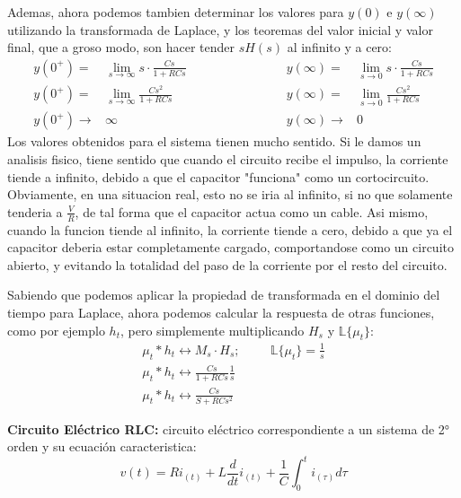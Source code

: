 \documentclass[12pt,a4paper]{report}
\begin{document}
\begin{enumerate}[label=\alph*)]
      Ademas, ahora podemos tambien determinar los valores para $y(0)$ e $y(\infty)$ utilizando la transformada de
      Laplace, y los teoremas del valor inicial y valor final, que a groso modo, son hacer tender $sH(s)$ al
      infinito y a cero:
      \begin{align*}
        y(0^+) =& \lim_{s\to\infty} s \cdot \frac{Cs}{1+RCs} \hspace{3cm} &y(\infty) =& \lim_{s\to0} s \cdot
          \frac{Cs}{1+RCs}\\[6pt]
        y(0^+) =& \lim_{s\to\infty} \frac{Cs^2}{1+RCs} \hspace{3cm} &y(\infty) =& \lim_{s\to0} \frac{Cs^2}{1+RCs}\\[6pt]
        y(0^+) \to& \infty \hspace{3cm} &y(\infty) \to& 0
      \end{align*}
      Los valores obtenidos para el sistema tienen mucho sentido. Si le damos un analisis fisico, tiene sentido que
      cuando el circuito recibe el impulso, la corriente tiende a infinito, debido a que el capacitor "funciona" como
      un cortocircuito. Obviamente, en una situacion real, esto no se iria al infinito, si no que solamente tenderia a
      $\frac{V}{R}$, de tal forma que el capacitor actua como un cable.
      Asi mismo, cuando la funcion tiende al infinito, la corriente tiende a cero, debido a que ya el capacitor deberia
      estar completamente cargado, comportandose como un circuito abierto, y evitando la totalidad del paso de la
      corriente por el resto del circuito.

      Sabiendo que podemos aplicar la propiedad de transformada en el dominio del tiempo para Laplace, ahora podemos
      calcular la respuesta de otras funciones, como por ejemplo $h_t$, pero simplemente multiplicando $H_s$ y
      $\mathbb{L}\{\mu_t\}$:
      \begin{gather*}
        \mu_t * h_t \longleftrightarrow M_s \cdot H_s; \hspace{1cm}\mathbb{L}\{\mu_t\} = \frac{1}{s}\\[6pt]
        \mu_t * h_t \longleftrightarrow \frac{Cs}{1+RCs} \frac{1}{s}\\[6pt]
        \mu_t * h_t \longleftrightarrow \frac{Cs}{S+RCs^2}
      \end{gather*}


  \end{enumerate}

  \newpage
  \textbf{Circuito Eléctrico RLC:} circuito eléctrico correspondiente a un sistema de 2° orden y su ecuación
  caracteristica:
  \begin{equation*}
    v(t) = Ri_{(t)} + L \frac{d}{dt} i_{(t)} + \frac{1}{C} \int_{0}^{t} i_{(\tau)} d\tau
  \end{equation*}
\end{document}

